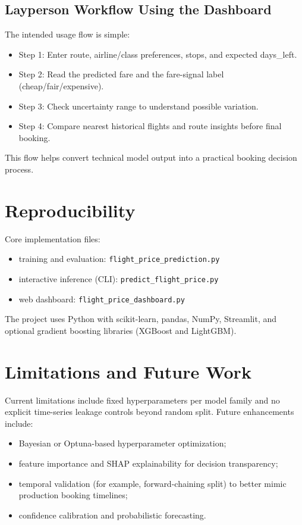 \documentclass[conference]{IEEEtran}
\begin{document}
\subsection{Layperson Workflow Using the Dashboard}
The intended usage flow is simple:
\begin{itemize}
\item Step 1: Enter route, airline/class preferences, stops, and expected days\_left.
\item Step 2: Read the predicted fare and the fare-signal label (cheap/fair/expensive).
\item Step 3: Check uncertainty range to understand possible variation.
\item Step 4: Compare nearest historical flights and route insights before final booking.
\end{itemize}

This flow helps convert technical model output into a practical booking decision process.

\section{Reproducibility}
Core implementation files:
\begin{itemize}
\item training and evaluation: \texttt{flight\_price\_prediction.py}
\item interactive inference (CLI): \texttt{predict\_flight\_price.py}
\item web dashboard: \texttt{flight\_price\_dashboard.py}
\end{itemize}

The project uses Python with scikit-learn, pandas, NumPy, Streamlit, and optional gradient boosting libraries (XGBoost and LightGBM).

\section{Limitations and Future Work}
Current limitations include fixed hyperparameters per model family and no explicit time-series leakage controls beyond random split. Future enhancements include:
\begin{itemize}
\item Bayesian or Optuna-based hyperparameter optimization;
\item feature importance and SHAP explainability for decision transparency;
\item temporal validation (for example, forward-chaining split) to better mimic production booking timelines;
\item confidence calibration and probabilistic forecasting.
\end{itemize}
\end{document}
